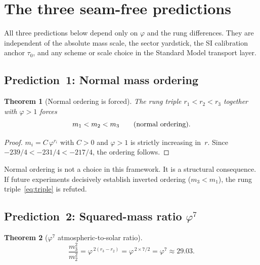 \documentclass[11pt]{article}
\newtheorem{theorem}{Theorem}
\theoremstyle{remark}
\newcommand{\phig}{\varphi}
\begin{document}
\section{The three seam-free predictions}
\label{sec:predictions}

All three predictions below depend only on $\phig$ and the rung
differences.  They are independent of the absolute mass scale,
the sector yardstick, the SI calibration anchor $\tau_0$, and
any scheme or scale choice in the Standard Model transport layer.

\subsection{Prediction~1: Normal mass ordering}

\begin{theorem}[Normal ordering is forced]
\label{thm:ordering}
The rung triple $r_1 < r_2 < r_3$ together with $\phig > 1$
forces
\begin{equation}\label{eq:ordering}
  m_1 < m_2 < m_3
  \qquad\textup{(normal ordering)}.
\end{equation}
\end{theorem}

\begin{proof}
$m_i = C\,\phig^{r_i}$ with $C>0$ and $\phig>1$ is strictly
increasing in~$r$.  Since
$-239/4 < -231/4 < -217/4$, the ordering follows.
\end{proof}

Normal ordering is not a choice in this framework.  It is a
structural consequence.  If future experiments decisively
establish inverted ordering ($m_3 < m_1$), the rung
triple~\eqref{eq:triple} is refuted.

\subsection{Prediction~2: Squared-mass ratio $\phig^7$}

\begin{theorem}[$\phig^7$ atmospheric-to-solar ratio]
\label{thm:phi7}
\begin{equation}\label{eq:phi7}
  \frac{m_3^2}{m_2^2}
  = \phig^{\,2(r_3-r_2)}
  = \phig^{\,2\times 7/2}
  = \phig^7
  \approx 29.03.
\end{equation}
\end{theorem}
\end{document}
